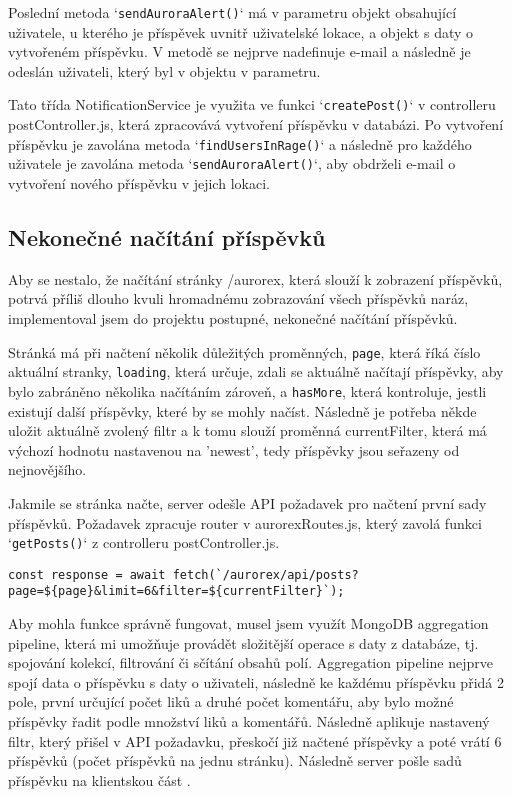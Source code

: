 \par Poslední metoda `\texttt{sendAuroraAlert()}` má v parametru objekt obsahující uživatele, u kterého je příspěvek uvnitř uživatelské lokace, a objekt s daty o vytvořeném příspěvku. V metodě se nejprve nadefinuje e-mail a následně je odeslán uživateli, který byl v objektu v parametru.
\par Tato třída NotificationService je využita ve funkci `\texttt{createPost()}` v controlleru postController.js, která zpracovává vytvoření příspěvku v databázi. Po vytvoření příspěvku je zavolána metoda `\texttt{findUsersInRage()}` a následně pro každého uživatele je zavolána metoda `\texttt{sendAuroraAlert()}`, aby obdrželi e-mail o vytvoření nového příspěvku v jejich lokaci.

\subsection{Nekonečné načítání příspěvků}
\par Aby se nestalo, že načítání stránky /aurorex, která slouží k zobrazení příspěvků, potrvá příliš dlouho kvuli hromadnému zobrazování všech příspěvků naráz, implementoval jsem do projektu postupné, nekonečné načítání příspěvků.
\par Stránká má při načtení několik důležitých proměnných, \texttt{page}, která říká číslo aktuální stranky, \texttt{loading}, která určuje, zdali se aktuálně načítají příspěvky, aby bylo zabráněno několika načítáním zároveň, a \texttt{hasMore}, která kontroluje, jestli existují další příspěvky, které by se mohly načíst. Následně je potřeba někde uložit aktuálně zvolený filtr a k tomu slouží proměnná currentFilter, která má výchozí hodnotu nastavenou na 'newest', tedy příspěvky jsou seřazeny od nejnovějšího.
\par Jakmile se stránka načte, server odešle API požadavek pro načtení první sady příspěvků. Požadavek zpracuje router v aurorexRoutes.js, který zavolá funkci `\texttt{getPosts()}` z controlleru postController.js.
\begin{lstlisting}[caption = {API požadavek pro obdržení sady příspěvků},label = {lst:stranka}]
    const response = await fetch(`/aurorex/api/posts?page=${page}&limit=6&filter=${currentFilter}`);
\end{lstlisting}
\par Aby mohla funkce správně fungovat, musel jsem využít MongoDB aggregation pipeline, která mi umožňuje provádět složitější operace s daty z databáze, tj. spojování kolekcí, filtrování či sčítání obsahů polí. Aggregation pipeline nejprve spojí data o příspěvku s daty o uživateli, následně ke každému příspěvku přidá 2 pole, první určující počet liků a druhé počet komentářu, aby bylo možné příspěvky řadit podle množství liků a komentářů. Následně aplikuje nastavený filtr, který přišel v API požadavku, přeskočí již načtené příspěvky a poté vrátí 6 příspěvků (počet příspěvků na jednu stránku). Následně server pošle sadů příspěvku na klientskou část \cite{mongodb_total_likes}.
